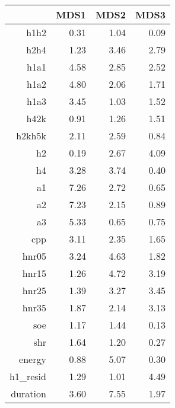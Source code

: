 \begin{table}[ht]
\centering
\begin{tabular}{rrrr}
  \hline
 & MDS1 & MDS2 & MDS3 \\ 
  \hline
h1h2 & 0.31 & 1.04 & 0.09 \\ 
  h2h4 & 1.23 & 3.46 & 2.79 \\ 
  h1a1 & 4.58 & 2.85 & 2.52 \\ 
  h1a2 & 4.80 & 2.06 & 1.71 \\ 
  h1a3 & 3.45 & 1.03 & 1.52 \\ 
  h42k & 0.91 & 1.26 & 1.51 \\ 
  h2kh5k & 2.11 & 2.59 & 0.84 \\ 
  h2 & 0.19 & 2.67 & 4.09 \\ 
  h4 & 3.28 & 3.74 & 0.40 \\ 
  a1 & 7.26 & 2.72 & 0.65 \\ 
  a2 & 7.23 & 2.15 & 0.89 \\ 
  a3 & 5.33 & 0.65 & 0.75 \\ 
  cpp & 3.11 & 2.35 & 1.65 \\ 
  hnr05 & 3.24 & 4.63 & 1.82 \\ 
  hnr15 & 1.26 & 4.72 & 3.19 \\ 
  hnr25 & 1.39 & 3.27 & 3.45 \\ 
  hnr35 & 1.87 & 2.14 & 3.13 \\ 
  soe & 1.17 & 1.44 & 0.13 \\ 
  shr & 1.64 & 1.20 & 0.27 \\ 
  energy & 0.88 & 5.07 & 0.30 \\ 
  h1\_resid & 1.29 & 1.01 & 4.49 \\ 
  duration & 3.60 & 7.55 & 1.97 \\ 
   \hline
\end{tabular}
\end{table}
